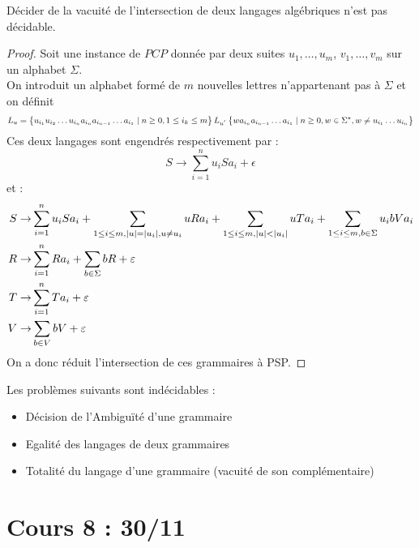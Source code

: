 \documentclass{cours}
\begin{document}
\begin{theorem}
    Décider de la vacuité de l'intersection de deux langages algébriques n'est pas décidable.
\end{theorem}
\begin{proof}
    Soit une instance de $PCP$ donnée par deux suites $u_{1}, \ldots, u_{m}$, $v_{1}, \ldots, v_{m}$ sur un alphabet $\Sigma$.\\
    On introduit un alphabet formé de $m$ nouvelles lettres n'appartenant pas à $\Sigma$ et on définit 
    \[
        L_{u} = \left\{u_{i_{1}}u_{i_{2}}\ldots u_{i_{n}}a_{i_{n}}a_{i_{n - 1}}\ldots a_{i_{1}}\mid n \geq 0, 1 \leq i_{k} \leq m\right\}\\ 
        L_{u^{'}} \left\{wa_{i_{n}}a_{i_{n-1}}\ldots a_{i_{1}}\mid n \geq 0, w \in \Sigma^{\star}, w \neq u_{i_{1}}\ldots u_{i_{n}}\right\}
    \]
    Ces deux langages sont engendrés respectivement par :
    \[
        S \rightarrow \sum_{i = 1}^{n}u_{i}Sa_{i} + \epsilon
    \]
    et : 
    \[
        \begin{aligned}
            S \rightarrow & \sum_{i = 1}^{n} u_{i}Sa_{i} + \sum_{1 \leq i \leq m, \left|u\right| = \left|u_{i}\right|, u \neq u_{i}} uRa_{i} + \sum_{1 \leq i \leq m, \left|u\right| < \left|u_{i}\right|} uTa_{i} + \sum_{1 \leq i \leq m, b \in \Sigma} u_{i}bVa_{i}\\
            R \rightarrow & \sum_{i = 1}^{n} Ra_{i} + \sum_{b \in \Sigma} bR + \varepsilon\\
            T \rightarrow & \sum_{i = 1}^{n} Ta_{i} + \varepsilon\\
            V \rightarrow & \sum_{b \in V}bV + \varepsilon
        \end{aligned}    
    \]
    On a donc réduit l'intersection de ces grammaires à PSP.
\end{proof}

\begin{proposition}
    Les problèmes suivants sont indécidables : 
    \begin{itemize}
        \item Décision de l'Ambiguïté d'une grammaire
        \item Egalité des langages de deux grammaires
        \item Totalité du langage d'une grammaire (vacuité de son complémentaire)
    \end{itemize}
\end{proposition}


\part[Classes de Complexité]{Cours 8 : 30/11}
\end{document}

